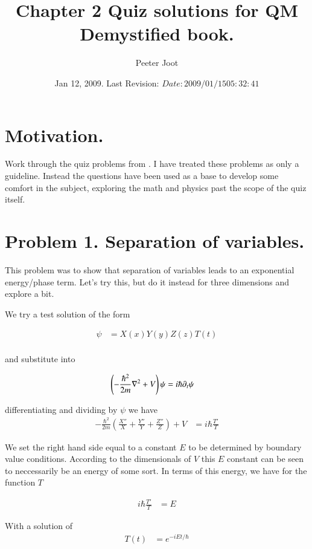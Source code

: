 \documentclass{article}
\title{ Chapter 2 Quiz solutions for QM Demystified book. }
\author{Peeter Joot}
\date{ Jan 12, 2009.  Last Revision: $Date: 2009/01/15 05:32:41 $ }
\begin{document}
\maketitle{}
\tableofcontents
\section{ Motivation. }

Work through the quiz problems from \cite{mcmahon2005qmd}.  I have treated these problems as only a guideline.  Instead the questions have been used as a
base to develop some comfort in the subject, exploring the math and physics past the scope of the quiz itself.

\section{ Problem 1. Separation of variables. }

This problem was to show that separation of variables leads to an exponential energy/phase
term.  Let's try this, but do it instead for three dimensions and explore a bit.

We try a test solution of the form

\begin{align*}
\psi &= X(x) Y(y) Z(z) T(t) \\
\end{align*}

and substitute into 

\begin{align*}
\left(-\frac{\hbar^2}{2m}\nabla^2 + V\right) \psi &= i \hbar \partial_t \psi
\end{align*}

differentiating and dividing by $\psi$ we have
\begin{align*}
-\frac{\hbar^2}{2m}
\left(
\frac{X''}{X}
+\frac{Y''}{Y}
+\frac{Z''}{Z}
\right)
 + V &= i \hbar \frac{T'}{T}
\end{align*}

We set the right hand side equal to a constant $E$ to be determined by boundary value conditions.
According to the dimensionals of $V$ this $E$ constant can be seen to neccessarily be an energy
of some sort.  In terms of this energy, we have for the function $T$

\begin{align*}
i \hbar \frac{T'}{T} &= E
\end{align*}

With a solution of
\begin{align*}
T(t) &= e^{-i E t/\hbar}
\end{align*}
\end{document}
